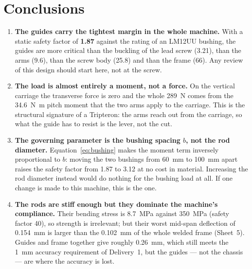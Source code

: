 \documentclass[11pt]{article}
\def\calculo{ }
\def\nombre{Group 2}
\newcommand{\sheet}[2]{\clearpage\def\calculo{#1}\def\nombre{#2}}
\begin{document}
\section{Conclusions}\label{sec:gui-conc}

\begin{enumerate}[leftmargin=*]
  \item \textbf{The guides carry the tightest margin in the whole machine.} With a static
        safety factor of \textbf{1.87} against the rating of an LM12UU bushing, the
        guides are more critical than the buckling of the lead screw (3.21), than the arms
        (9.6), than the screw body (25.8) and than the frame (66). Any review of this
        design should start here, not at the screw.
  \item \textbf{The load is almost entirely a moment, not a force.} On the vertical
        carriage the transverse force is zero and the whole \SI{289}{\newton} comes from
        the \SI{34.6}{\newton\metre} pitch moment that the two arms apply to the carriage.
        This is the structural signature of a Tripteron: the arms reach out from the
        carriage, so what the guide has to resist is the lever, not the cut.
  \item \textbf{The governing parameter is the bushing spacing $b$, not the rod
        diameter.} Equation~\eqref{eq:bushing} makes the moment term inversely
        proportional to $b$: moving the two bushings from \SI{60}{\milli\metre} to
        \SI{100}{\milli\metre} apart raises the safety factor from 1.87 to 3.12 at
        no cost in material. Increasing the rod diameter instead would do nothing for the
        bushing load at all. If one change is made to this machine, this is the one.
  \item \textbf{The rods are stiff enough but they dominate the machine's compliance.}
        Their bending stress is \SI{8.7}{\mega\pascal} against \SI{350}{\mega\pascal}
        (safety factor 40), so strength is irrelevant; but their worst mid-span deflection
        of \SI{0.154}{\milli\metre} is larger than the \SI{0.102}{\milli\metre} of the
        whole welded frame (Sheet~5). Guides and frame together give roughly
        \SI{0.26}{\milli\metre}, which still meets the \SI{1}{\milli\metre} accuracy
        requirement of Delivery~1, but the guides --- not the chassis --- are where the
        accuracy is lost.
\end{enumerate}

\sheet{Sheet 5 -- Chassis finite element verification}{D. Zuluaga}
\end{document}
